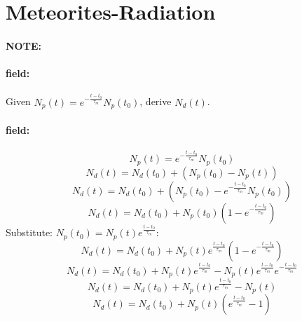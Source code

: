 \documentclass[12pt]{article}
\newenvironment{note}{\paragraph{NOTE:}}{}
\newenvironment{field}{\paragraph{field:}}{}
\begin{document}
\section{Meteorites-Radiation}
\begin{note}
   \begin{field}
        Given \(N_p(t)=e^{-\frac{t-t_0}{\tau_m}}N_p(t_0)\), derive \(N_d(t)\).
   \end{field}
   \begin{field}
   		\[
   			N_p(t)=e^{-\frac{t-t_0}{\tau_m}}N_p(t_0)
   		\]
   		\[
   			N_d(t)=N_d(t_0)+(N_p(t_0)-N_p(t))
   		\]
   		\[
   			N_d(t)=N_d(t_0)+(N_p(t_0)-e^{-\frac{t-t_0}{\tau_m}}N_p(t_0))
   		\]
   		\[
   			N_d(t)=N_d(t_0)+N_p(t_0)(1-e^{-\frac{t-t_0}{\tau_m}})
   		\]
   		Substitute: \(N_p(t_0)=N_p(t)e^{\frac{t-t_0}{\tau_m}}\):
   		\[
   			N_d(t)=N_d(t_0)+N_p(t)e^{\frac{t-t_0}{\tau_m}}(1-e^{-\frac{t-t_0}{\tau_m}})
   		\]
   		\[
   			N_d(t)=N_d(t_0)+N_p(t)e^{\frac{t-t_0}{\tau_m}}-N_p(t)e^{\frac{t-t_0}{\tau_m}}e^{-\frac{t-t_0}{\tau_m}}
   		\]
   		\[
   			N_d(t)=N_d(t_0)+N_p(t)e^{\frac{t-t_0}{\tau_m}}-N_p(t)
   		\]
   		\[
   			N_d(t)=N_d(t_0)+N_p(t)(e^{\frac{t-t_0}{\tau_m}}-1)
   		\]
   \end{field}
\end{note}
\end{document}
